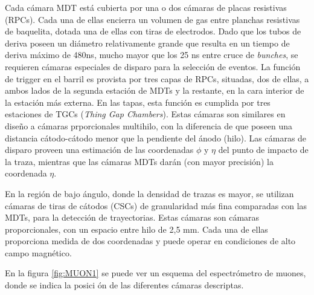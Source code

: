    Cada c\'amara MDT est\'a cubierta por una o dos c\'amaras de placas resistivas (RPCs). Cada una de ellas encierra un volumen de gas entre planchas resistivas de baquelita, dotada una de ellas con tiras de electrodos. Dado que los tubos de deriva poseen un di\'ametro relativamente grande que resulta en un tiempo de deriva m\'aximo de 480ns, mucho mayor que los 25 ns entre cruce de \emph{bunches}, se requieren c\'amaras especiales de disparo para la selecci\'on de eventos. La funci\'on de trigger en el barril es provista por tres capas de RPCs, situadas, dos de ellas, a ambos lados de la segunda estaci\'on de MDTs y la restante, en la cara interior de la estaci\'on m\'as externa. 
En las tapas, esta funci\'on es cumplida por tres estaciones de TGCs (\emph{Thing Gap Chambers}). Estas c\'amaras son similares en dise\~no a c\'amaras prporcionales multihilo, con la diferencia de que poseen una distancia c\'atodo-c\'atodo menor que la pendiente del \'anodo (hilo). 
   Las c\'amaras de disparo proveen una estimaci\'on de las coordenadas $\phi$ y $\eta$ del punto de impacto de la traza, mientras que las c\'amaras MDTs dar\'an (con mayor precisi\'on) la coordenada $\eta$.

    En la regi\'on de bajo \'angulo, donde la densidad de trazas es mayor, se utilizan c\'amaras de tiras de c\'atodos (CSCs) de granularidad m\'as fina comparadas con las MDTs, para la detecci\'on de trayectorias. Estas c\'amaras son c\'amaras proporcionales, con un espacio entre hilo de 2,5 mm. Cada una de ellas proporciona medida de dos coordenadas y puede operar en condiciones de alto campo magn\'etico.

   En la figura \ref{fig:MUON1} se puede ver un esquema del espectr\'ometro de muones, donde se indica la posici \'on de las diferentes c\'amaras descriptas.

